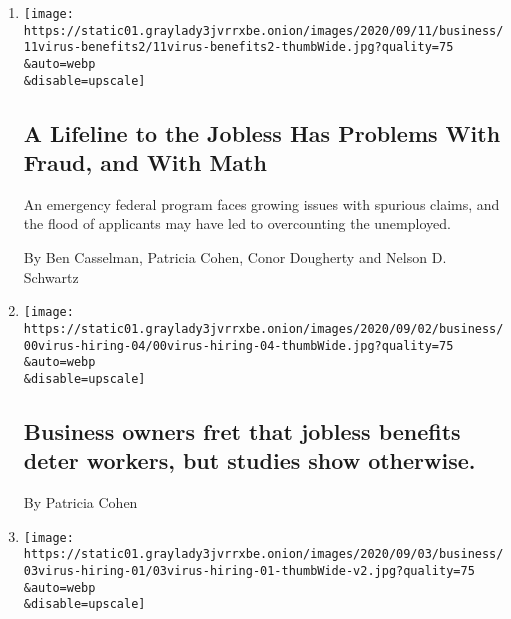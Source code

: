 \begin{enumerate}
\def\labelenumi{\arabic{enumi}.}
\item
  \href{/2020/09/11/business/economy/pandemic-unemployment-assistance-fraud.html}{}

  \texttt{[image: https://static01.graylady3jvrrxbe.onion/images/2020/09/11/business/11virus-benefits2/11virus-benefits2-thumbWide.jpg?quality=75\\\&auto=webp\\\&disable=upscale]}

  \hypertarget{a-lifeline-to-the-jobless-has-problems-with-fraud-and-with-math}{%
  \subsection{A Lifeline to the Jobless Has Problems With Fraud, and
  With
  Math}\label{a-lifeline-to-the-jobless-has-problems-with-fraud-and-with-math}}

  An emergency federal program faces growing issues with spurious
  claims, and the flood of applicants may have led to overcounting the
  unemployed.

  By Ben Casselman, Patricia Cohen, Conor Dougherty and Nelson D.
  Schwartz
\item
  \href{/2020/09/10/business/business-owners-fret-that-jobless-benefits-deter-workers-but-studies-show-otherwise.html}{}

  \texttt{[image: https://static01.graylady3jvrrxbe.onion/images/2020/09/02/business/00virus-hiring-04/00virus-hiring-04-thumbWide.jpg?quality=75\\\&auto=webp\\\&disable=upscale]}

  \hypertarget{business-owners-fret-that-jobless-benefits-deter-workers-but-studies-show-otherwise}{%
  \subsection{Business owners fret that jobless benefits deter workers,
  but studies show
  otherwise.}\label{business-owners-fret-that-jobless-benefits-deter-workers-but-studies-show-otherwise}}

  By Patricia Cohen
\item
  \href{/2020/09/10/business/economy/unemployment-benefits-hiring.html}{}

  \texttt{[image: https://static01.graylady3jvrrxbe.onion/images/2020/09/03/business/03virus-hiring-01/03virus-hiring-01-thumbWide-v2.jpg?quality=75\\\&auto=webp\\\&disable=upscale]}

  \hypertarget{do-jobless-benefits-deter-workers-some-employers-say-yes-studies-dont}{%
}
\end{enumerate}
